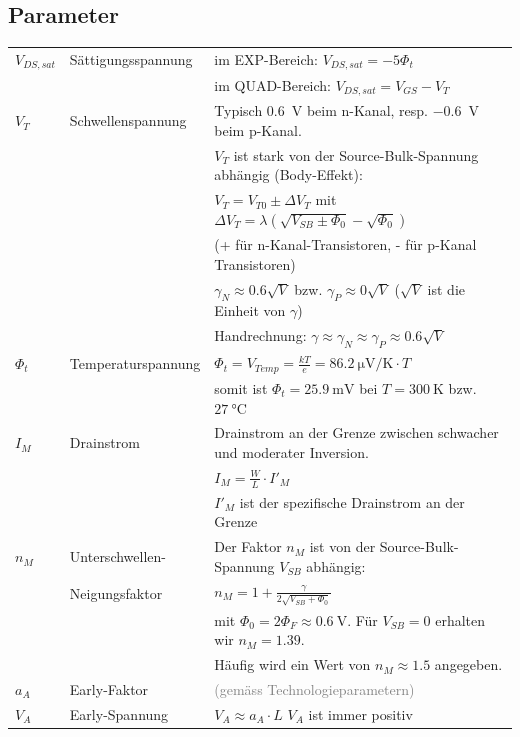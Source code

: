 \subsection{Parameter}
\begin{tabular}{|p{}|p{}|p{}|}
	\hline
	$V_{DS,sat}$&Sättigungsspannung&im EXP-Bereich:   $V_{DS,sat} = -5\Phi_t$ \\ 
	&&im QUAD-Bereich:	$V_{DS,sat} = V_{GS}-V_T$\\ \hline
	$V_T$&Schwellenspannung&Typisch \SI{0.6}{\volt} beim n-Kanal, resp. \SI{-0.6}{\volt} beim p-Kanal.\\
	&& $V_T$ ist stark von der Source-Bulk-Spannung abhängig (Body-Effekt):\\
	&&$V_T = V_{T0}\pm \Delta V_T$ mit $\Delta V_T = \lambda \left( \sqrt{V_{SB} \pm \Phi_0} - \sqrt{\Phi_0}\right)$\\
	&&(+ für n-Kanal-Transistoren, - für p-Kanal Transistoren)\\
	&& $\gamma_N \approx 0.6 \sqrt{V}$ bzw. $\gamma_P \approx 0 \sqrt{V}$ ($\sqrt{V}$ ist die Einheit von $\gamma$)\\
	&&Handrechnung: $\gamma \approx \gamma_N \approx \gamma_P \approx 0.6\sqrt{V}$\\ \hline
	$\Phi_t$&Temperaturspannung&$\Phi_t = V_{Temp} = \frac{kT}{e} = \SI{86.2}{\micro\volt / \kelvin} \cdot T$\\
	&&somit ist $\Phi_t = \SI{25.9}{\milli\volt}$ bei $T=\SI{300}{\kelvin}$ bzw. $\SI{27}{\degreeCelsius}$\\ \hline
	$I_M$&Drainstrom&Drainstrom an der Grenze zwischen schwacher und moderater Inversion.\\
	&&$I_M=\frac{W}{L}\cdot I'_M$\\
	&&$I'_M$ ist der spezifische Drainstrom an der Grenze\\ \hline
	$n_M$&Unterschwellen-&Der Faktor $n_M$ ist von der Source-Bulk-Spannung $V_{SB}$ abhängig:\\
	&Neigungsfaktor&$n_M=1+\frac{\gamma}{2\sqrt{V_{SB}+\Phi_0}}$\\
	&&mit $\Phi_0 = 2\Phi_F \approx \SI{0.6}{\volt}$. Für $V_{SB} = 0$ erhalten wir $n_M = 1.39$.\\
	&&Häufig wird ein Wert von $n_M \approx 1.5$ angegeben.\\ \hline
	$a_A$&Early-Faktor&\textcolor{gray}{(gemäss Technologieparametern)}\\ \hline
	$V_A$&Early-Spannung&$V_A \approx a_A \cdot L$ \hspace{0.5cm} $V_A$ ist immer positiv\\ \hline

\end{tabular}
